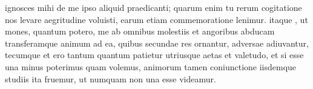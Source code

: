  ignosces mihi de me ipso aliquid praedicanti; quarum enim tu rerum cogitatione nos levare aegritudine voluisti, earum etiam commemoratione lenimur. itaque , ut mones, quantum potero, me ab omnibus molestiis et angoribus abducam transferamque animum ad ea, quibus secundae res ornantur, adversae adiuvantur, tecumque et ero tantum quantum patietur utriusque aetas et valetudo, et si esse una minus poterimus quam volemus, animorum tamen coniunctione iisdemque studiis ita fruemur, ut numquam non una esse videamur.

